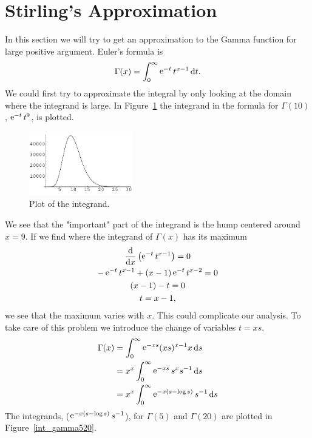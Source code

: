 \section{Stirling's Approximation}

In this section we will try to get an approximation to the Gamma function
for large positive argument.  Euler's formula is
\[ \Gamma(x) = \int_0^\infty \mathop{\mathrm{e}}\nolimits^{-t} t^{x-1}\,\mathrm{d} t. \]
We could first try to approximate the integral by only looking at the 
domain where the integrand is large.  In Figure~\ref{int_gamma10} the integrand
in the formula for $\Gamma(10)$, $\mathop{\mathrm{e}}\nolimits^{-t} t^9$,  is plotted.  

\begin{figure}[h!]
  \begin{center}
    \includegraphics[width=0.4\textwidth]{ode/gamma/intgam10}
  \end{center}
  \caption{Plot of the integrand.}
  \label{int_gamma10}
\end{figure}





We see that 
the "important" part of the integrand is the hump centered around $x = 9$.
If we find where the integrand of $\Gamma(x)$ has its maximum
\begin{gather*}
  \frac{\mathrm{d}}{\mathrm{d} x} \left( \mathop{\mathrm{e}}\nolimits^{-t} t^{x-1} \right) = 0 \\
  - \mathop{\mathrm{e}}\nolimits^{-t} t^{x-1} + (x-1) \mathop{\mathrm{e}}\nolimits^{-t} t^{x-2} = 0 \\
  (x-1) - t = 0 \\
  t = x-1,
\end{gather*}
we see that the maximum varies with $x$.  This could complicate our 
analysis.  To take care of this problem we introduce the change of
variables $t = x s$.  
\begin{align*}
  \Gamma(x) &= \int_0^\infty \mathop{\mathrm{e}}\nolimits^{-x s} (x s)^{x-1} x\,\mathrm{d} s \\
  &= x^x \int_0^\infty \mathop{\mathrm{e}}\nolimits^{-x s} s^x s^{-1} \,\mathrm{d} s \\
  &= x^x \int_0^\infty \mathop{\mathrm{e}}\nolimits^{-x (s - \log s)} s^{-1} \,\mathrm{d} s
\end{align*}
The integrands, ($\mathop{\mathrm{e}}\nolimits^{-x (s-\log s)} s^{-1}$), for $\Gamma(5)$ and $\Gamma(20)$ are plotted in Figure~\ref{int_gamma520}.



